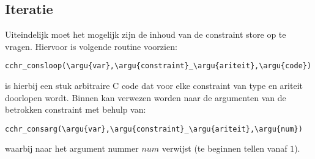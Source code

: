 \subsection{Iteratie}

Uiteindelijk moet het mogelijk zijn de inhoud van de constraint store op te vragen. Hiervoor is volgende routine voorzien: \begin{Verbatim}[commandchars=\\\{\}]
  cchr_consloop(\argu{var},\argu{constraint}_\argu{ariteit},\argu{code})
\end{Verbatim}
 is hierbij een stuk arbitraire C code dat voor elke constraint van type  en ariteit  doorlopen wordt. Binnen  kan verwezen worden naar de argumenten van de betrokken constraint met behulp van: \begin{Verbatim}[commandchars=\\\{\}]
  cchr_consarg(\argu{var},\argu{constraint}_\argu{ariteit},\argu{num})
\end{Verbatim}
waarbij  naar het argument nummer $num$ verwijst (te beginnen tellen vanaf $1$).
